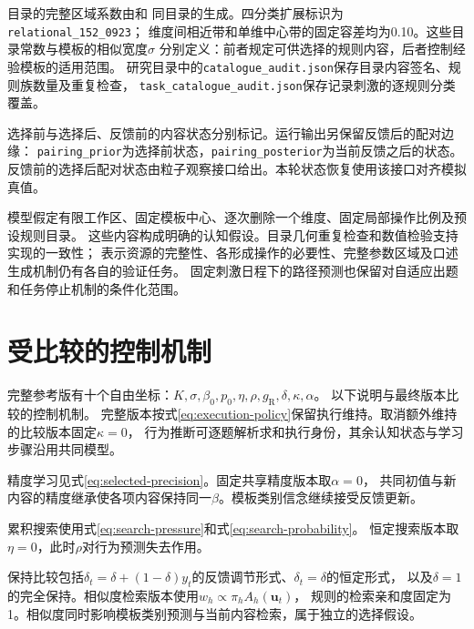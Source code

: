 \documentclass[11pt,a4paper]{article}
\numberwithin{equation}{section}
\begin{document}
目录的完整区域系数由和
同目录的生成。四分类扩展标识为\texttt{relational\_152\_0923}；
维度间相近带和单维中心带的固定容差均为0.10。这些目录常数与模板的相似宽度$\sigma$
分别定义：前者规定可供选择的规则内容，后者控制经验模板的适用范围。
研究目录中的\texttt{catalogue\_audit.json}保存目录内容签名、规则族数量及重复检查，
\texttt{task\_catalogue\_audit.json}保存记录刺激的逐规则分类覆盖。

选择前与选择后、反馈前的内容状态分别标记。运行输出另保留反馈后的配对边缘：
\texttt{pairing\_prior}为选择前状态，\texttt{pairing\_posterior}为当前反馈之后的状态。
反馈前的选择后配对状态由粒子观察接口给出。本轮状态恢复使用该接口对齐模拟真值。

模型假定有限工作区、固定模板中心、逐次删除一个维度、固定局部操作比例及预设规则目录。
这些内容构成明确的认知假设。目录几何重复检查和数值检验支持实现的一致性；
表示资源的完整性、各形成操作的必要性、完整参数区域及口述生成机制仍有各自的验证任务。
固定刺激日程下的路径预测也保留对自适应出题和任务停止机制的条件化范围。

\appendix
\section{受比较的控制机制}
\label{sec:variants}
完整参考版有十个自由坐标：$K,\sigma,\beta_0,p_0,\eta,\rho,g_{\mathrm R},\delta,\kappa,\alpha$。
以下说明与最终版本比较的控制机制。
完整版本按式\eqref{eq:execution-policy}保留执行维持。取消额外维持的比较版本固定$\kappa=0$，
行为推断可逐题解析求和执行身份，其余认知状态与学习步骤沿用共同模型。

精度学习见式\eqref{eq:selected-precision}。固定共享精度版本取$\alpha=0$，
共同初值与新内容的精度继承使各项内容保持同一$\beta$。模板类别信念继续接受反馈更新。

累积搜索使用式\eqref{eq:search-pressure}和式\eqref{eq:search-probability}。
恒定搜索版本取$\eta=0$，此时$\rho$对行为预测失去作用。

保持比较包括$\delta_t=\delta+(1-\delta)y_t$的反馈调节形式、$\delta_t=\delta$的恒定形式，
以及$\delta=1$的完全保持。相似度检索版本使用$w_h\propto\pi_h A_h(\bm u_t)$，
规则的检索亲和度固定为1。相似度同时影响模板类别预测与当前内容检索，属于独立的选择假设。
\end{document}
